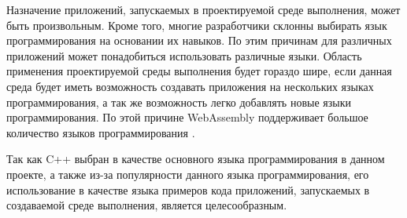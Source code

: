 Назначение приложений, запускаемых в проектируемой среде выполнения, может быть произвольным. 
Кроме того, многие разработчики склонны выбирать язык программирования на основании их навыков.
По этим причинам для различных приложений может понадобиться использовать различные языки.
Область применения проектируемой среды выполнения будет гораздо шире, если данная среда будет иметь возможность создавать приложения на нескольких языках программирования, а так же возможность легко добавлять новые языки программирования.
По этой причине WebAssembly поддерживает большое количество языков программирования \cite{WASMLanguages}.

Так как C++ выбран в качестве основного языка программирования в данном проекте, а также из-за популярности данного языка программирования, его использование в качестве языка примеров кода приложений, запускаемых в создаваемой среде выполнения, является целесообразным.
